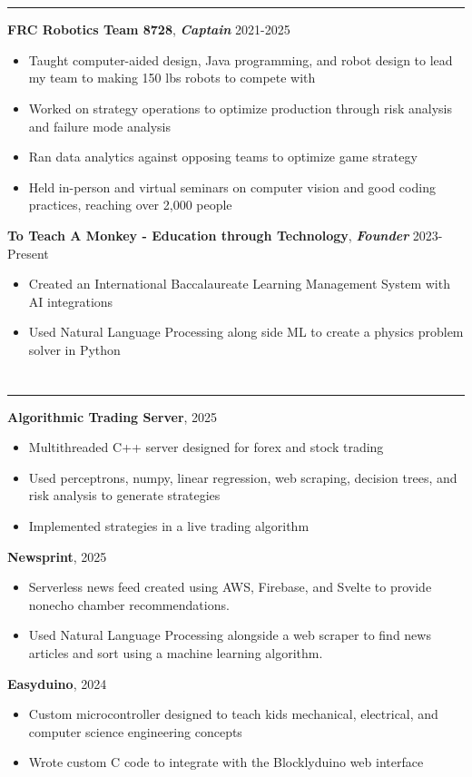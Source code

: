 \documentclass{article}[11pt]
\newcommand{\underlinedsection}[1]{ \section*{\sc{#1}}
	\rule{\textwidth}{1pt} }
\newenvironment{denseitemize} %
{ \begin{itemize}[leftmargin = 20pt, topsep = 0pt, itemsep = 0pt] }
{\end{itemize} }
\newcommand{\job}[3]{ {\textbf{#1}, \textit{\textbf{#2}} \hfill {#3}} }
\begin{document}
\underlinedsection{Other experience}
\job{FRC Robotics Team 8728}{Captain}{2021-2025}
\begin{denseitemize}
	\item Taught computer-aided design, Java programming, and robot design to lead my team to making 150 lbs robots to compete with
    \item Worked on strategy operations to optimize production through risk analysis and failure mode analysis
    \item Ran data analytics against opposing teams to optimize game strategy
    \item Held in-person and virtual seminars on computer vision and good coding practices, reaching over 2,000 people
\end{denseitemize}
\job{To Teach A Monkey - Education through Technology}{Founder}{2023-Present}
\begin{denseitemize}
	\item Created an International Baccalaureate Learning Management System with AI integrations
    \item Used Natural Language Processing along side ML to create a physics problem solver in Python
    
    
\end{denseitemize}
\underlinedsection{Projects}
\job{Algorithmic Trading Server}{}{2025}
\begin{denseitemize}
	\item Multithreaded C++ server designed for forex and stock trading 
    \item Used perceptrons, numpy, linear regression, web scraping, decision trees, and risk analysis to generate strategies
    \item Implemented strategies in a live trading algorithm  
\end{denseitemize}
\job{Newsprint}{}{2025}
\begin{denseitemize}
	\item Serverless news feed created using AWS, Firebase, and Svelte to provide nonecho chamber recommendations.
    \item Used Natural Language Processing alongside a web scraper to find news articles and sort using a machine learning algorithm.
\end{denseitemize}
\job{Easyduino}{}{2024}
\begin{denseitemize}
	\item Custom microcontroller designed to teach kids mechanical, electrical, and computer science engineering concepts
    \item Wrote custom C code to integrate with the Blocklyduino web interface
\end{denseitemize}


\thispagestyle{empty}
\end{document}
